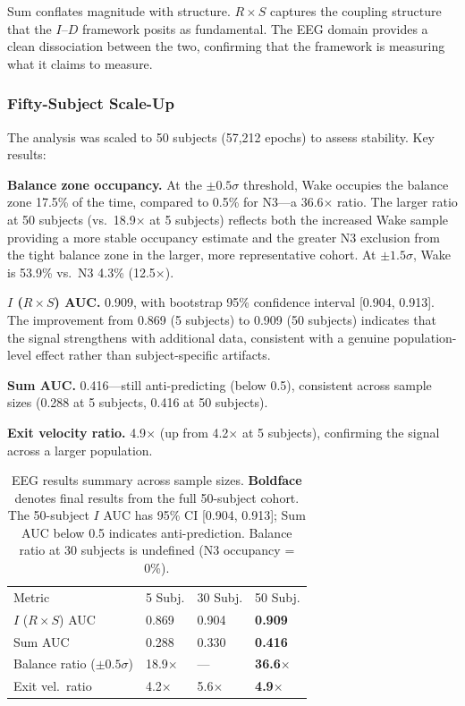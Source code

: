 \documentclass[aip,cha,reprint,amsmath,amssymb,final]{revtex4-2}
\begin{document}
Sum conflates magnitude with structure. $R \times S$ captures the coupling structure that the $I$--$D$ framework posits as fundamental. The EEG domain provides a clean dissociation between the two, confirming that the framework is measuring what it claims to measure.

\subsubsection{Fifty-Subject Scale-Up}

The analysis was scaled to 50 subjects (57,212 epochs) to assess stability. Key results:

\textbf{Balance zone occupancy.} At the $\pm 0.5\sigma$ threshold, Wake occupies the balance zone 17.5\% of the time, compared to 0.5\% for N3---a 36.6$\times$ ratio. The larger ratio at 50 subjects (vs.\ 18.9$\times$ at 5 subjects) reflects both the increased Wake sample providing a more stable occupancy estimate and the greater N3 exclusion from the tight balance zone in the larger, more representative cohort. At $\pm 1.5\sigma$, Wake is 53.9\% vs.\ N3 4.3\% (12.5$\times$).

\textbf{$I$ ($R \times S$) AUC.} 0.909, with bootstrap 95\% confidence interval [0.904, 0.913]. The improvement from 0.869 (5 subjects) to 0.909 (50 subjects) indicates that the signal strengthens with additional data, consistent with a genuine population-level effect rather than subject-specific artifacts.

\textbf{Sum AUC.} 0.416---still anti-predicting (below 0.5), consistent across sample sizes (0.288 at 5 subjects, 0.416 at 50 subjects).

\textbf{Exit velocity ratio.} 4.9$\times$ (up from 4.2$\times$ at 5 subjects), confirming the signal across a larger population.

\begin{table}[!htbp]
\caption[EEG results summary across 5, 30, and 50 subject sample sizes]{\label{tab:eeg}EEG results summary across sample sizes. \textbf{Boldface} denotes final results from the full 50-subject cohort. The 50-subject $I$ AUC has 95\% CI [0.904, 0.913]; Sum AUC below 0.5 indicates anti-prediction. Balance ratio at 30 subjects is undefined (N3 occupancy = 0\%).}
\begin{ruledtabular}
\begin{tabular}{p{2.4cm}lll}
Metric & 5 Subj. & 30 Subj. & 50 Subj. \\
$I$ ($R{\times}S$) AUC & 0.869 & 0.904 & \textbf{0.909} \\
Sum AUC & 0.288 & 0.330 & \textbf{0.416} \\
Balance ratio ($\pm 0.5\sigma$) & 18.9$\times$ & --- & \textbf{36.6$\times$} \\
Exit vel.\ ratio & 4.2$\times$ & 5.6$\times$ & \textbf{4.9$\times$} \\
\end{tabular}
\end{ruledtabular}
\end{table}
\end{document}

